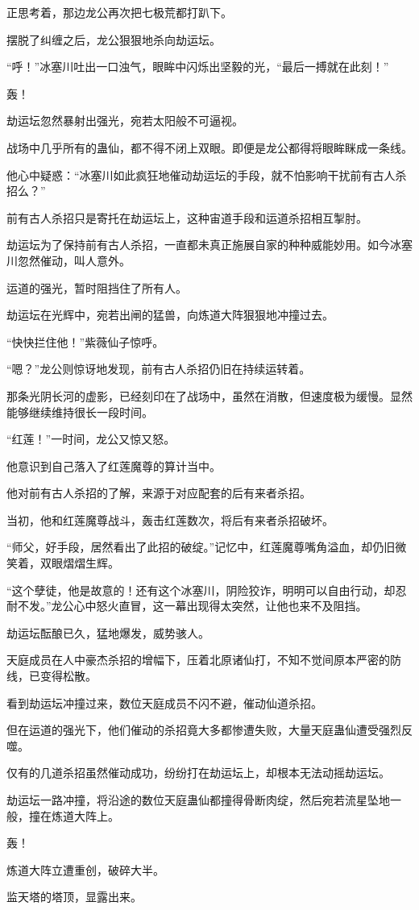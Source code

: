 \begin{this_body}
正思考着，那边龙公再次把七极荒都打趴下。

摆脱了纠缠之后，龙公狠狠地杀向劫运坛。

“呼！”冰塞川吐出一口浊气，眼眸中闪烁出坚毅的光，“最后一搏就在此刻！”

轰！

劫运坛忽然暴射出强光，宛若太阳般不可逼视。

战场中几乎所有的蛊仙，都不得不闭上双眼。即便是龙公都得将眼眸眯成一条线。

他心中疑惑：“冰塞川如此疯狂地催动劫运坛的手段，就不怕影响干扰前有古人杀招么？”

前有古人杀招只是寄托在劫运坛上，这种宙道手段和运道杀招相互掣肘。

劫运坛为了保持前有古人杀招，一直都未真正施展自家的种种威能妙用。如今冰塞川忽然催动，叫人意外。

运道的强光，暂时阻挡住了所有人。

劫运坛在光辉中，宛若出闸的猛兽，向炼道大阵狠狠地冲撞过去。

“快快拦住他！”紫薇仙子惊呼。

“嗯？”龙公则惊讶地发现，前有古人杀招仍旧在持续运转着。

那条光阴长河的虚影，已经刻印在了战场中，虽然在消散，但速度极为缓慢。显然能够继续维持很长一段时间。

“红莲！”一时间，龙公又惊又怒。

他意识到自己落入了红莲魔尊的算计当中。

他对前有古人杀招的了解，来源于对应配套的后有来者杀招。

当初，他和红莲魔尊战斗，轰击红莲数次，将后有来者杀招破坏。

“师父，好手段，居然看出了此招的破绽。”记忆中，红莲魔尊嘴角溢血，却仍旧微笑着，双眼熠熠生辉。

“这个孽徒，他是故意的！还有这个冰塞川，阴险狡诈，明明可以自由行动，却忍耐不发。”龙公心中怒火直冒，这一幕出现得太突然，让他也来不及阻挡。

劫运坛酝酿已久，猛地爆发，威势骇人。

天庭成员在人中豪杰杀招的增幅下，压着北原诸仙打，不知不觉间原本严密的防线，已变得松散。

看到劫运坛冲撞过来，数位天庭成员不闪不避，催动仙道杀招。

但在运道的强光下，他们催动的杀招竟大多都惨遭失败，大量天庭蛊仙遭受强烈反噬。

仅有的几道杀招虽然催动成功，纷纷打在劫运坛上，却根本无法动摇劫运坛。

劫运坛一路冲撞，将沿途的数位天庭蛊仙都撞得骨断肉绽，然后宛若流星坠地一般，撞在炼道大阵上。

轰！

炼道大阵立遭重创，破碎大半。

监天塔的塔顶，显露出来。

\end{this_body}

